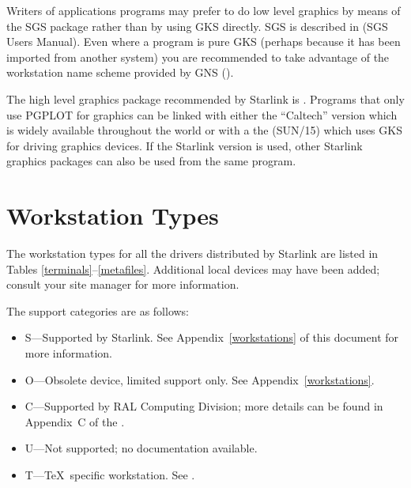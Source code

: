 \documentclass[11pt,nolof]{starlink}
\begin{document}
Writers of applications programs may prefer to do low level graphics by means
of the SGS package rather than by using GKS directly.
SGS is described in  (SGS Users Manual).
Even where a program is pure GKS (perhaps because it has been imported from
another system) you are recommended to take advantage of the workstation name
scheme provided by GNS ().

The high level graphics package recommended by Starlink is
. Programs
that only use PGPLOT for graphics can be linked with either the
``Caltech'' version which is
widely available throughout the world or with a the
 (SUN/15)
which uses GKS for driving graphics devices. If the Starlink version
is used, other Starlink graphics packages can also be used from the same
program.

\section{Workstation Types}
The workstation types for all the drivers distributed by Starlink are
listed in Tables \ref{terminals}--\ref{metafiles}.
Additional local devices may
have been added; consult your site manager for more information.

The support categories are as follows:
\begin{itemize}
\item S---Supported by Starlink. See Appendix~\ref{workstations} of
this document for more
information.
\item O---Obsolete device, limited support only. See
Appendix~\ref{workstations}.
\item C---Supported by RAL Computing Division; more details can be found in
Appendix~C of the
.
\item U---Not supported; no documentation available.
\item T---\TeX\ specific workstation. See {}.
\end{itemize}
\end{document}
